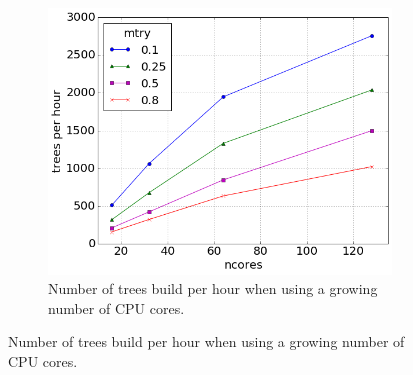 \documentclass[a4paper]{amsart}
\begin{document}
\begin{figure}[tbhp]
\begin{subfigure}[b]{0.45\linewidth}
      \includegraphics[totalheight=5cm]{../plos16/figs/cpu_mtry_trees_per_hour.png}
      \caption{Number of trees build per hour when using a growing number of CPU cores.}
      \label{figure:synthetictiming.b}
      \vspace{4ex}
    \end{subfigure} 
\end{figure}
\end{document}
